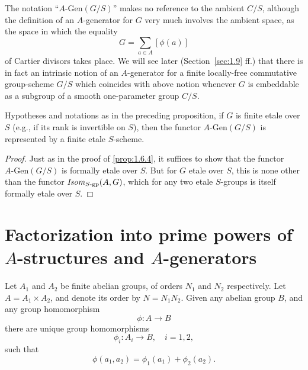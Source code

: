 \begin{remark}\label{rem:1.6.6}
The notation ``$A\text{-}\mathrm{Gen}(G/S)$'' makes no reference to the ambient $C/S$, although the definition of an $A$-generator for $G$ very much involves the ambient space, as the space in which the equality
\[
G = \sum_{a \in A} [\phi(a)]
\]
of Cartier divisors takes place. We will see later (Section~\ref{sec:1.9} ff.) that there is in fact an intrinsic notion of an $A$-generator for a finite locally-free commutative group-scheme $G/S$ which coincides with above notion whenever $G$ is embeddable as a subgroup of a smooth one-parameter group $C/S$.
\end{remark}

\begin{proposition}\label{prop:1.6.7}
Hypotheses and notations as in the preceding proposition, if $G$ is finite etale over $S$ (e.g., if its rank is invertible on $S$), then the functor $A\text{-}\mathrm{Gen}(G/S)$ is represented by a finite etale $S$-scheme.
\end{proposition}

\begin{proof}
Just as in the proof of \ref{prop:1.6.4}, it suffices to show that the functor $A\text{-}\mathrm{Gen}(G/S)$ is formally etale over $S$. But for $G$ etale over $S$, this is none other than the functor $\mathit{Isom}_{S\text{-}\mathrm{gp}}(A, G)$, which for any two etale $S$-groups is itself formally etale over $S$.
\end{proof}

\section{Factorization into prime powers of $A$-structures and $A$-generators}\label{sec:1.7}

\kmitem\label{item:1.7.1}
Let $A_1$ and $A_2$ be finite abelian groups, of orders $N_1$ and $N_2$ respectively. Let $A = A_1 \times A_2$, and denote its order by $N = N_1 N_2$. Given any abelian group $B$, and any group homomorphism
\begin{equation}\label{eq:1.7.1.1}
\phi : A \to B
\end{equation}
there are unique group homomorphisms
\begin{equation}\label{eq:1.7.1.2}
\phi_i : A_i \to B, \quad i = 1, 2,
\end{equation}
such that
\begin{equation}\label{eq:1.7.1.3}
\phi(a_1, a_2) = \phi_1(a_1) + \phi_2(a_2).
\end{equation}


